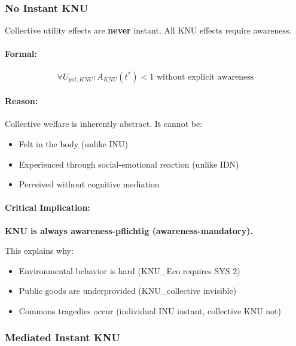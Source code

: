 \subsubsection{No Instant KNU}

\begin{axiom}
\label{ax:no-instant-knu}
Collective utility effects are \textbf{never} instant. All KNU effects require awareness.
\end{axiom}

\paragraph{Formal:}
\begin{equation}
\forall U_{pot,KNU}: A_{KNU}(t^*) < 1 \text{ without explicit awareness}
\end{equation}

\paragraph{Reason:}
Collective welfare is inherently abstract. It cannot be:
\begin{itemize}
\item Felt in the body (unlike INU)
\item Experienced through social-emotional reaction (unlike IDN)
\item Perceived without cognitive mediation
\end{itemize}

\paragraph{Critical Implication:}
\textbf{KNU is always awareness-pflichtig (awareness-mandatory).}

This explains why:
\begin{itemize}
\item Environmental behavior is hard (KNU_Eco requires SYS 2)
\item Public goods are underprovided (KNU_collective invisible)
\item Commons tragedies occur (individual INU instant, collective KNU not)
\end{itemize}

\subsubsection{Mediated Instant KNU}

